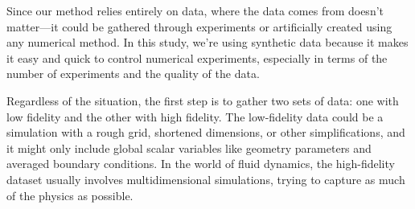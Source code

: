 Since our method relies entirely on data, where the data comes from doesn't matter—it could be gathered through experiments or artificially created using any numerical method. In this study, we're using synthetic data because it makes it easy and quick to control numerical experiments, especially in terms of the number of experiments and the quality of the data.

Regardless of the situation, the first step is to gather two sets of data: one with low fidelity and the other with high fidelity. The low-fidelity data could be a simulation with a rough grid, shortened dimensions, or other simplifications, and it might only include global scalar variables like geometry parameters and averaged boundary conditions. In the world of fluid dynamics, the high-fidelity dataset usually involves multidimensional simulations, trying to capture as much of the physics as possible.

